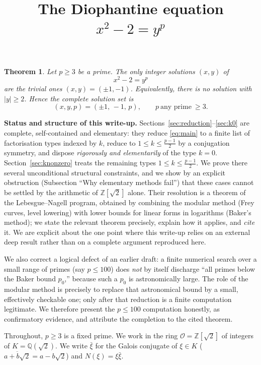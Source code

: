 \documentclass{amsart}
\newtheorem{theorem}{Theorem}
\theoremstyle{definition}
\begin{document}
\title{The Diophantine equation $x^2-2=y^p$}
\maketitle

\begin{theorem}\label{thm:main}
Let $p\ge 3$ be a prime. The only integer solutions $(x,y)$ of
\begin{equation}\label{eq:main}
x^2-2=y^p
\end{equation}
are the trivial ones $(x,y)=(\pm 1,-1)$. Equivalently, there is no solution
with $|y|\ge 2$. Hence the complete solution set is
\[
(x,y,p)=(\pm1,\,-1,\,p),\qquad p\ \text{any prime}\ \ge3 .
\]
\end{theorem}

\noindent\textbf{Status and structure of this write-up.}
Sections~\ref{sec:reduction}--\ref{sec:k0} are complete, self-contained and
elementary: they reduce \eqref{eq:main} to a finite list of factorisation
types indexed by $k$, reduce to $1\le k\le\frac{p-1}{2}$ by a conjugation
symmetry, and dispose \emph{rigorously and elementarily} of the type $k=0$.
Section~\ref{sec:knonzero} treats the remaining types
$1\le k\le\frac{p-1}{2}$. We prove there several unconditional structural
constraints, and we show by an explicit obstruction (Subsection
``Why elementary methods fail'') that these cases cannot be settled by the
arithmetic of $\mathbb{Z}[\sqrt2]$ alone. Their resolution is a theorem of the
Lebesgue--Nagell program, obtained by combining the modular method (Frey
curves, level lowering) with lower bounds for linear forms in logarithms
(Baker's method); we state the relevant theorem precisely, explain how it
applies, and \emph{cite} it. We are explicit about the one point where this
write-up relies on an external deep result rather than on a complete argument
reproduced here.

\smallskip
We also correct a logical defect of an earlier draft: a finite numerical
search over a small range of primes (say $p\le100$) does \emph{not} by itself
discharge ``all primes below the Baker bound $p_0$,'' because such a $p_0$ is
astronomically large. The role of the modular method is precisely to replace
that astronomical bound by a small, effectively checkable one; only after that
reduction is a finite computation legitimate. We therefore present the
$p\le100$ computation honestly, as confirmatory evidence, and attribute the
completion to the cited theorem.

Throughout, $p\ge 3$ is a fixed prime. We work in the ring
$\mathcal{O}=\mathbb{Z}[\sqrt2]$ of integers of $K=\mathbb{Q}(\sqrt2)$. We
write $\bar\xi$ for the Galois conjugate of $\xi\in K$
($\overline{a+b\sqrt2}=a-b\sqrt2$) and $N(\xi)=\xi\bar\xi$.
\end{document}
